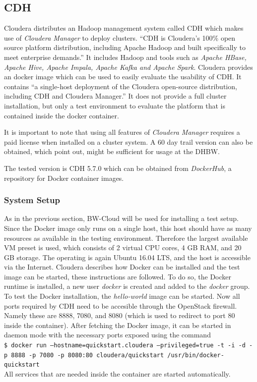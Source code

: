 \subsection{\acl{CDH}}

Cloudera distributes an Hadoop management system called \ac{CDH} which makes use of \emph{Cloudera Manager} to deploy clusters.
\enquote{CDH is Cloudera’s 100\% open source platform distribution, including Apache Hadoop and built specifically to meet enterprise demands.}\autocite[][]{cloudera2018cdh}
It includes Hadoop and tools such as \emph{Apache HBase, Apache Hive, Apache Impala, Apache Kafka and Apache Spark}.
Cloudera provides an docker image which can be used to easily evaluate the usability of \ac{CDH}.
It contains \enquote{a single-host deployment of the Cloudera open-source distribution, including CDH and Cloudera Manager.} \autocite[][]{cloudera2018docker}
It does not provide a full cluster installation, but only a test environment to evaluate the platform that is contained inside the docker container.

It is important to note that using all features of \emph{Cloudera Manager} requires a paid license when installed on a cluster system. A 60 day trail version can also be obtained, which  \textcite[][p.~39]{wi2018managementsystems} point out, might be sufficient for usage at the \ac{DHBW}.

The tested version is \ac{CDH} 5.7.0 which can be obtained from \emph{DockerHub}, a repository for Docker container images.

\subsubsection{System Setup}

As in the previous section, BW-Cloud will be used for installing a test setup.
Since the Docker image only runs on a single host, this host should have as many resources as available in the testing environment.
Therefore the largest available \ac{VM} preset is used, which consists of 2 virtual \ac{CPU} cores, 
4 \ac{GB} \ac{RAM}, and 20 \ac{GB} storage. The operating is again Ubuntu 16.04 \ac{LTS}, 
and the host is accessible via the Internet. 
Cloudera describes how Docker can be installed and the test image can be started, 
these instructions are followed. \autocite[][]{cloudera2018docker}
To do so, the Docker runtime is installed, a new  user \emph{docker} is created and added to the \emph{docker} group. To test the Docker installation, the \emph{hello-world} image can be started.
Now all ports required by \ac{CDH} need to be accesible through the OpenStack firewall.
Namely these are 8888, 7080, and 8080 (which is used to redirect to port 80 inside the container).
After fetching the Docker  image, it can be started in daemon mode with the necessary ports exposed using the command\\
\texttt{\$ docker run --hostname=quickstart.cloudera --privileged=true -t -i -d -p 8888 -p 7080 -p 8080:80 cloudera/quickstart /usr/bin/docker-quickstart}\\
All services that are needed inside the container are started automatically.


